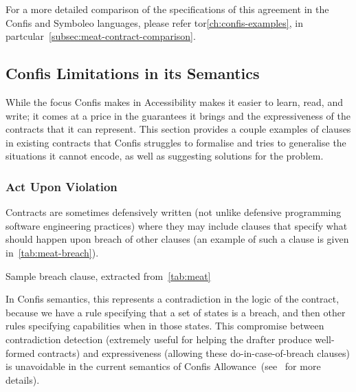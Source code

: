For a more detailed comparison of the specifications of this agreement in the Confis and Symboleo languages, please refer tor\autoref{ch:confis-examples}, in partcular~\autoref{subsec:meat-contract-comparison}.

\subsection{Confis Limitations in its Semantics}\label{subsec:confis-lang-limits}

While the focus Confis makes in Accessibility makes it easier to learn, read, and write;
it comes at a price in the guarantees it brings and the expressiveness of the contracts that it can represent.
This section provides a couple examples of clauses in existing contracts that Confis struggles to formalise and tries to generalise the situations it cannot encode, as well as suggesting solutions for the problem.

\subsubsection{Act Upon Violation}
\label{subsubsec:limits-violations}

Contracts are sometimes defensively written (not unlike defensive programming software engineering practices) where they may include clauses that specify what should happen upon breach of other clauses (an example of such a clause is given in~\autoref{tab:meat-breach}).

\begin{table}[h]
    \centering
    \setlength{\fboxsep}{10pt}
    \caption[Sample breach clause]{Sample breach clause, extracted from~\autoref{tab:meat}}
    \label{tab:meat-breach}
\end{table}

In Confis semantics, this represents a contradiction in the logic of the contract, because we have a rule specifying that a set of states is a breach, and then other rules specifying capabilities when in those states.
This compromise between contradiction detection (extremely useful for helping the drafter produce well-formed contracts) and expressiveness (allowing these do-in-case-of-breach clauses) is unavoidable in the current semantics of Confis Allowance~(see~ for more details).


